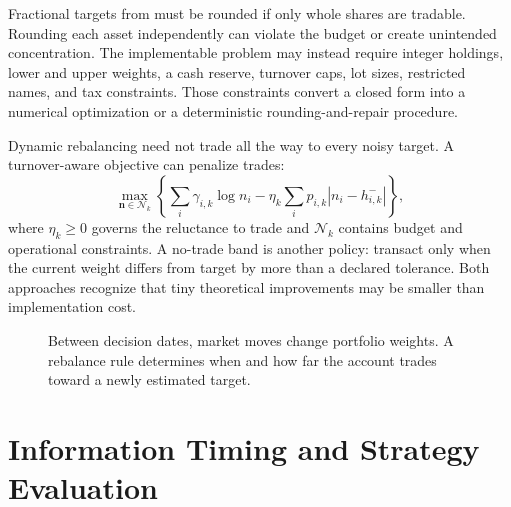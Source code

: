 \documentclass[11pt]{article}
\begin{document}
Fractional targets from  must be rounded if only whole shares are tradable. Rounding each asset independently can violate the budget or create unintended concentration. The implementable problem may instead require integer holdings, lower and upper weights, a cash reserve, turnover caps, lot sizes, restricted names, and tax constraints. Those constraints convert a closed form into a numerical optimization or a deterministic rounding-and-repair procedure.

Dynamic rebalancing need not trade all the way to every noisy target. A turnover-aware objective can penalize trades:
\begin{equation}
  \label{eq:turnover-objective}
  \max_{\mathbf n\in\mathcal N_k}
  \left\{
  \sum_i\gamma_{i,k}\log n_i
  -\eta_k\sum_i p_{i,k}|n_i-h_{i,k}^-|
  \right\},
\end{equation}
where $\eta_k\geq0$ governs the reluctance to trade and $\mathcal N_k$ contains budget and operational constraints. A no-trade band is another policy: transact only when the current weight differs from target by more than a declared tolerance. Both approaches recognize that tiny theoretical improvements may be smaller than implementation cost.

\begin{figure}[ht]
  \centering
  \caption{Between decision dates, market moves change portfolio weights. A rebalance rule determines when and how far the account trades toward a newly estimated target.}
  \label{fig:weight-path}
\end{figure}

\section{Information Timing and Strategy Evaluation}
\end{document}
